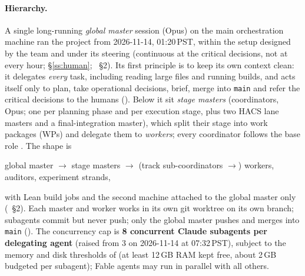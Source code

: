 \begin{sloppypar}
\paragraph{Hierarchy.} A single long-running \emph{global master} session (Opus) on the main orchestration machine
ran the project from 2026-11-14, 01:20\,PST, within the setup designed by the team and under its steering (continuous at the critical decisions, not at every hour; \S\ref{ss:human}; ~\S2). Its first
principle is to keep its own context clean: it delegates \emph{every} task, including reading large files and running
builds, and acts itself only to plan, take operational decisions, brief, merge into \texttt{main} and refer the critical decisions to the humans
(). Below it sit \emph{stage masters} (coordinators, Opus; one per planning
phase and per execution stage, plus two HACS lane masters and a final-integration master), which split their stage
into work packages (WPs) and delegate them to \emph{workers}; every coordinator follows the base role
. The shape is
\begin{center}
\small
global master $\to$ stage masters $\to$ (track sub-coordinators $\to$) workers, auditors, experiment strands,
\end{center}
with Lean build jobs and the second machine attached to the global master only
(~\S2). Each master and worker works in its own git worktree on its own
branch; subagents commit but never push; only the global master pushes and merges into \texttt{main}
(). The concurrency cap is \textbf{8 concurrent Claude subagents per delegating
agent} (raised from 3 on 2026-11-14 at 07:32\,PST), subject to the memory and disk thresholds of
 (at least 12\,GB RAM kept free, about 2\,GB budgeted per subagent); Fable agents may
run in parallel with all others.


\end{sloppypar}

